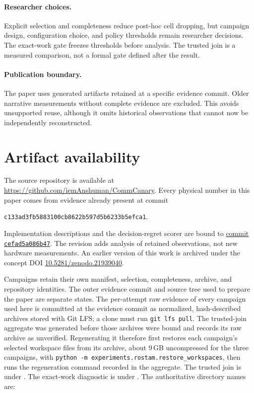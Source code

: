 \documentclass[10pt,twocolumn]{article}
\begin{document}
\paragraph{Researcher choices.} Explicit selection and completeness reduce
post-hoc cell dropping, but campaign design, configuration choice, and policy
thresholds remain researcher decisions. The exact-work gate freezes thresholds
before analysis. The trusted join is a measured comparison, not a formal gate
defined after the result.

\paragraph{Publication boundary.} The paper uses generated artifacts retained
at a specific evidence commit. Older narrative measurements without complete
evidence are excluded. This avoids unsupported reuse, although it omits
historical observations that cannot now be independently reconstructed.

\section{Artifact availability}

The source repository is available at
\url{https://github.com/iemAnshuman/CommCanary}. Every physical number in this
paper comes from evidence already present at commit
\begin{center}
\texttt{c133ad3fb5883100cb8622b597d5b6233b5efca1}.
\end{center}
Implementation descriptions and the decision-regret scorer are bound to
\href{https://github.com/iemAnshuman/CommCanary/tree/cefad5a086b4723755bbe33b33e96f9f3a2c8e36}{commit \texttt{cefad5a086b47}}.
The revision adds analysis of retained observations, not new hardware
measurements. An earlier version of this work is archived under the concept DOI
\href{https://doi.org/10.5281/zenodo.21939040}{10.5281/zenodo.21939040}.

Campaigns retain their own manifest, selection, completeness, archive, and
repository identities. The outer evidence commit and source tree used to
prepare the paper are separate states. The per-attempt raw evidence of every
campaign used here is committed at the evidence commit as normalized,
hash-described archives stored with Git LFS; a clone must run
\texttt{git lfs pull}. The trusted-join aggregate was generated before those
archives were bound and records its raw archive as unverified. Regenerating it
therefore first restores each campaign's selected workspace files from its
archive, about 9\,GB uncompressed for the three campaigns, with
\texttt{python -m experiments.rostam.restore\_workspaces}, then runs the
regeneration command recorded in the aggregate. The trusted join is under
. The exact-work diagnostic is
under .
The authoritative directory names are:
\end{document}
